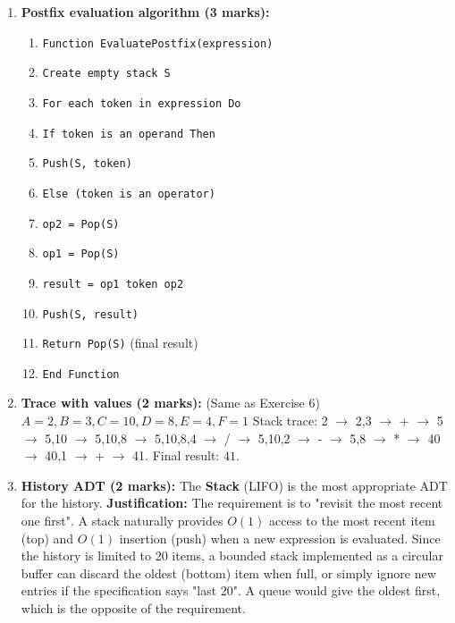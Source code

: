 \documentclass[11pt]{article}
\begin{document}
\begin{corrige}
\begin{enumerate}
\item \textbf{Postfix evaluation algorithm (3 marks):}
\begin{enumerate}
\item \texttt{Function EvaluatePostfix(expression)}
\item \quad \texttt{Create empty stack S}
\item \quad \texttt{For each token in expression Do}
\item \quad \quad \texttt{If token is an operand Then}
\item \quad \quad \quad \texttt{Push(S, token)}
\item \quad \quad \texttt{Else (token is an operator)}
\item \quad \quad \quad \texttt{op2 = Pop(S)}
\item \quad \quad \quad \texttt{op1 = Pop(S)}
\item \quad \quad \quad \texttt{result = op1 token op2}
\item \quad \quad \quad \texttt{Push(S, result)}
\item \quad \texttt{Return Pop(S)} \quad (final result)
\item \texttt{End Function}
\end{enumerate}

\item \textbf{Trace with values (2 marks):} (Same as Exercise 6)
$A=2, B=3, C=10, D=8, E=4, F=1$
Stack trace:
2 $\rightarrow$ 2,3 $\rightarrow$ + $\rightarrow$ 5 $\rightarrow$ 5,10 $\rightarrow$ 5,10,8 $\rightarrow$ 5,10,8,4 $\rightarrow$ / $\rightarrow$ 5,10,2 $\rightarrow$ - $\rightarrow$ 5,8 $\rightarrow$ * $\rightarrow$ 40 $\rightarrow$ 40,1 $\rightarrow$ + $\rightarrow$ 41.
Final result: $41$.

\item \textbf{History ADT (2 marks):} The \textbf{Stack} (LIFO) is the most appropriate ADT for the history.
\textbf{Justification:} The requirement is to "revisit the most recent one first". A stack naturally provides $O(1)$ access to the most recent item (top) and $O(1)$ insertion (push) when a new expression is evaluated. Since the history is limited to 20 items, a bounded stack implemented as a circular buffer can discard the oldest (bottom) item when full, or simply ignore new entries if the specification says "last 20". A queue would give the oldest first, which is the opposite of the requirement.
\end{enumerate}
\end{corrige}
\end{document}
